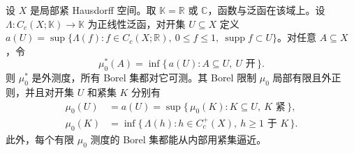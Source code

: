 \begin{lemma}\label{b1:lem:positive-functional-outer-measure}
设 \(X\) 是局部紧 Hausdorff 空间。取 \(\mathbb K=\mathbb R\) 或 \(\mathbb C\)，函数与泛函在该域上。设 \(\Lambda:C_c(X;\mathbb K)\to\mathbb K\) 为正线性泛函，对开集 \(U\subseteq X\) 定义 \(a(U)=\sup\{\Lambda(f):f\in C_c(X;\mathbb R),\ 0\le f\le1,\ \operatorname{supp}f\subset U\}\)。对任意 \(A\subseteq X\)，令
\[
 \mu_0^*(A)=\inf\{\,a(U):A\subseteq U,\ U\text{ 开}\,\}.
\]
则 \(\mu_0^*\) 是外测度，所有 Borel 集都对它可测。其 Borel 限制 \(\mu_0\) 局部有限且外正则，并且对开集 \(U\) 和紧集 \(K\) 分别有
\begin{align}
 \mu_0(U)&=a(U)=\sup\{\,\mu_0(K):K\subseteq U,\ K\text{ 紧}\,\},
 \label{b1:eq:positive-functional-open-inner}\\
 \mu_0(K)&=\inf\{\,\Lambda(h):h\in C_c^+(X),\ h\geq1\text{ 于 }K\,\}.
 \label{b1:eq:positive-functional-compact-price}
\end{align}
此外，每个有限 \(\mu_0\) 测度的 Borel 集都能从内部用紧集逼近。
\end{lemma}

